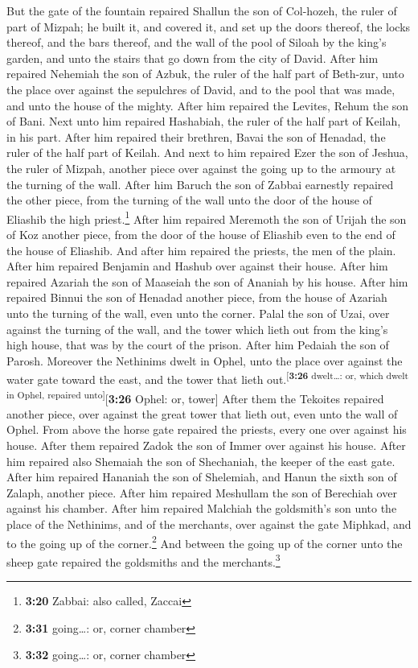 But the gate of the fountain repaired Shallun the son of Col-hozeh, the
ruler of part of Mizpah; he built it, and covered it, and set up the
doors thereof, the locks thereof, and the bars thereof, and the wall of
the pool of Siloah by the king's garden, and unto the stairs that go
down from the city of David.  After him repaired Nehemiah
the son of Azbuk, the ruler of the half part of Beth-zur, unto the place
over against the sepulchres of David, and to the pool that was made, and
unto the house of the mighty.  After him repaired the
Levites, Rehum the son of Bani. Next unto him repaired Hashabiah, the
ruler of the half part of Keilah, in his part.  After him
repaired their brethren, Bavai the son of Henadad, the ruler of the half
part of Keilah.  And next to him repaired Ezer the son of
Jeshua, the ruler of Mizpah, another piece over against the going up to
the armoury at the turning of the wall.  After him Baruch
the son of Zabbai earnestly repaired the other piece, from the turning
of the wall unto the door of the house of Eliashib the high
priest.\footnote{\textbf{3:20} Zabbai: also called, Zaccai}
 After him repaired Meremoth the son of Urijah the son of
Koz another piece, from the door of the house of Eliashib even to the
end of the house of Eliashib.  And after him repaired the
priests, the men of the plain.  After him repaired
Benjamin and Hashub over against their house. After him repaired Azariah
the son of Maaseiah the son of Ananiah by his house. 
After him repaired Binnui the son of Henadad another piece, from the
house of Azariah unto the turning of the wall, even unto the corner.
 Palal the son of Uzai, over against the turning of the
wall, and the tower which lieth out from the king's high house, that was
by the court of the prison. After him Pedaiah the son of Parosh.
 Moreover the Nethinims dwelt in Ophel, unto the place
over against the water gate toward the east, and the tower that lieth
out.\textsuperscript{{[}\textbf{3:26} dwelt\ldots: or, which dwelt in
Ophel, repaired unto{]}}{[}\textbf{3:26} Ophel: or, tower{]}
 After them the Tekoites repaired another piece, over
against the great tower that lieth out, even unto the wall of Ophel.
 From above the horse gate repaired the priests, every
one over against his house.  After them repaired Zadok
the son of Immer over against his house. After him repaired also
Shemaiah the son of Shechaniah, the keeper of the east gate.
 After him repaired Hananiah the son of Shelemiah, and
Hanun the sixth son of Zalaph, another piece. After him repaired
Meshullam the son of Berechiah over against his chamber. 
After him repaired Malchiah the goldsmith's son unto the place of the
Nethinims, and of the merchants, over against the gate Miphkad, and to
the going up of the corner.\footnote{\textbf{3:31} going\ldots: or,
  corner chamber}  And between the going up of the corner
unto the sheep gate repaired the goldsmiths and the
merchants.\footnote{\textbf{3:32} going\ldots: or, corner chamber}

